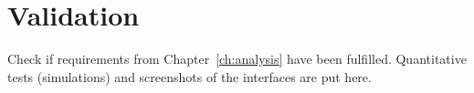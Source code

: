 \chapter{Validation}\label{ch:validation}

Check if requirements from Chapter~\ref{ch:analysis} have been fulfilled.
Quantitative tests (simulations) and screenshots of the interfaces are put here.